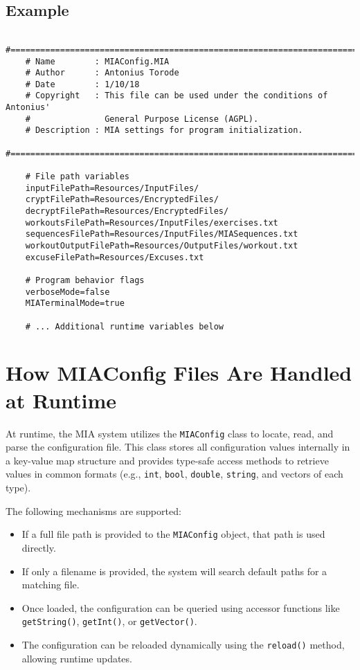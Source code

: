 \subsection*{Example}

\begin{lstlisting}
	#============================================================================
	# Name        : MIAConfig.MIA
	# Author      : Antonius Torode
	# Date        : 1/10/18
	# Copyright   : This file can be used under the conditions of Antonius' 
	#               General Purpose License (AGPL).
	# Description : MIA settings for program initialization.
	#============================================================================
	
	# File path variables
	inputFilePath=Resources/InputFiles/
	cryptFilePath=Resources/EncryptedFiles/
	decryptFilePath=Resources/EncryptedFiles/
	workoutsFilePath=Resources/InputFiles/exercises.txt
	sequencesFilePath=Resources/InputFiles/MIASequences.txt
	workoutOutputFilePath=Resources/OutputFiles/workout.txt
	excuseFilePath=Resources/Excuses.txt
	
	# Program behavior flags
	verboseMode=false
	MIATerminalMode=true
	
	# ... Additional runtime variables below
\end{lstlisting}

\section{How MIAConfig Files Are Handled at Runtime}

At runtime, the MIA system utilizes the \texttt{MIAConfig} class to locate, read, and parse the configuration file. This class stores all configuration values internally in a key-value map structure and provides type-safe access methods to retrieve values in common formats (e.g., \texttt{int}, \texttt{bool}, \texttt{double}, \texttt{string}, and vectors of each type).

The following mechanisms are supported:

\begin{itemize}
	\item If a full file path is provided to the \texttt{MIAConfig} object, that path is used directly.
	\item If only a filename is provided, the system will search default paths for a matching file.
	\item Once loaded, the configuration can be queried using accessor functions like \texttt{getString()}, \texttt{getInt()}, or \texttt{getVector()}.
	\item The configuration can be reloaded dynamically using the \texttt{reload()} method, allowing runtime updates.
\end{itemize}

